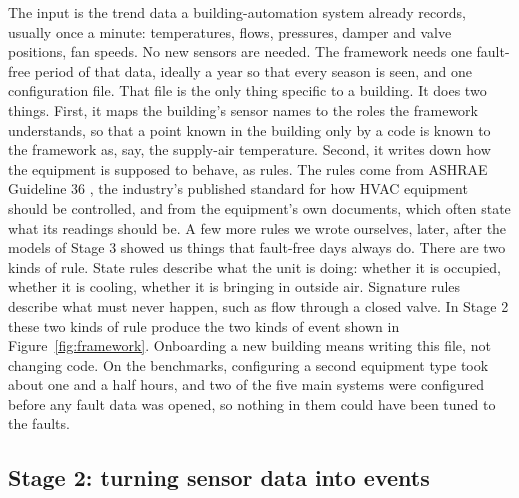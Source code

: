 \documentclass[conference]{IEEEtran}
\begin{document}
The input is the trend data a building-automation system already records, usually once a minute: temperatures, flows, pressures, damper and valve positions, fan speeds. No new sensors are needed. The framework needs one fault-free period of that data, ideally a year so that every season is seen, and one configuration file. That file is the only thing specific to a building. It does two things. First, it maps the building's sensor names to the roles the framework understands, so that a point known in the building only by a code is known to the framework as, say, the supply-air temperature. Second, it writes down how the equipment is supposed to behave, as rules. The rules come from ASHRAE Guideline 36 \cite{ashrae2021guideline36}, the industry's published standard for how HVAC equipment should be controlled, and from the equipment's own documents, which often state what its readings should be. A few more rules we wrote ourselves, later, after the models of Stage 3 showed us things that fault-free days always do. There are two kinds of rule. State rules describe what the unit is doing: whether it is occupied, whether it is cooling, whether it is bringing in outside air. Signature rules describe what must never happen, such as flow through a closed valve. In Stage 2 these two kinds of rule produce the two kinds of event shown in Figure~\ref{fig:framework}. Onboarding a new building means writing this file, not changing code. On the benchmarks, configuring a second equipment type took about one and a half hours, and two of the five main systems were configured before any fault data was opened, so nothing in them could have been tuned to the faults.

\subsection{Stage 2: turning sensor data into events}
\end{document}
